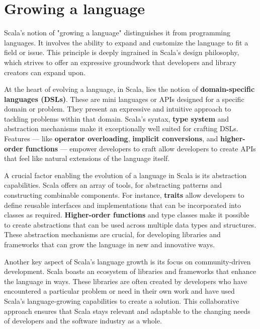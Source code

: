 \section{Growing a language}

Scala's notion of "growing a language" distinguishes it from programming languages. It involves the ability to expand and customize the language to fit a field or issue. This principle is deeply ingrained in Scala's design philosophy, which strives to offer an expressive groundwork that developers and library creators can expand upon.\footnotemark[\value{footnote}]

At the heart of evolving a language, in Scala, lies the notion of \textbf{domain-specific languages (DSLs)}. These are mini languages or APIs designed for a specific domain or problem. They present an expressive and intuitive approach to tackling problems within that domain. Scala's syntax, \textbf{type system} and abstraction mechanisms make it exceptionally well suited for crafting DSLs. Features  — like \textbf{operator overloading}, \textbf{implicit conversions}, and \textbf{higher-order functions} — empower developers to craft allow developers to create APIs that feel like natural extensions of the language itself.\footnotemark[\value{footnote}]

A crucial factor enabling the evolution of a language in Scala is its abstraction capabilities. Scala offers an array of tools, for abstracting patterns and constructing combinable components. For instance, \textbf{traits} allow developers to define reusable interfaces and implementations that can be incorporated into classes as required. \textbf{Higher-order functions} and type classes make it possible to create abstractions that can be used across multiple data types and structures. These abstraction mechanisms are crucial, for developing libraries and frameworks that can grow the language in new and innovative ways.\footnotemark[\value{footnote}]

Another key aspect of Scala's language growth is its focus on community-driven development. Scala boasts an ecosystem of libraries and frameworks that enhance the language in ways. These libraries are often created by developers who have encountered a particular problem or need in their own work and have used Scala's language-growing capabilities to create a solution. This collaborative approach ensures that Scala stays relevant and adaptable to the changing needs of developers and the software industry as a whole.\footnotemark[\value{footnote}] 

